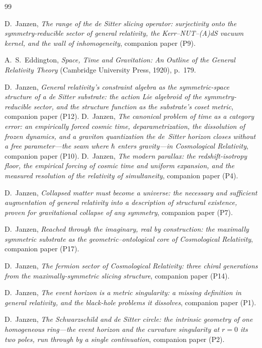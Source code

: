\documentclass[11pt,a4paper]{article}
\begin{document}
\begin{thebibliography}{99}

D.~Janzen,
\emph{The range of the de Sitter slicing operator: surjectivity onto the symmetry-reducible sector of general relativity, the Kerr--NUT--(A)dS vacuum kernel, and the wall of inhomogeneity}, companion paper (P9).

 A.~S.~Eddington, \emph{Space, Time and Gravitation: An Outline of the General Relativity Theory} (Cambridge University Press, 1920), p.~179.

 D.~Janzen,
\emph{General relativity's constraint algebra as the symmetric-space structure of a de Sitter substrate: the action Lie algebroid of the symmetry-reducible sector, and the structure function as the substrate's coset metric}, companion paper (P12).
 D.~Janzen, \emph{The canonical problem of time as a category error: an empirically forced cosmic time, deparametrization, the dissolution of frozen dynamics, and a graviton quantization the de~Sitter horizon closes without a free parameter---the seam where $\hbar$ enters gravity---in Cosmological Relativity}, companion paper (P10).
D.~Janzen,
\emph{The modern parallax: the redshift-isotropy floor, the empirical forcing of cosmic time and uniform expansion, and the measured resolution of the relativity of simultaneity}, companion paper (P4).

 D.~Janzen, \emph{Collapsed matter must become a universe: the necessary and sufficient augmentation of general relativity into a description of structural existence, proven for gravitational collapse of any symmetry}, companion paper (P7).

 D.~Janzen, \emph{Reached through the imaginary, real by construction: the maximally symmetric substrate as the geometric--ontological core of Cosmological Relativity}, companion paper (P17).

 D.~Janzen, \emph{The fermion sector of Cosmological Relativity: three chiral generations from the maximally-symmetric slicing structure}, companion paper (P14).

D.~Janzen,
\emph{The event horizon is a metric singularity: a missing definition in general relativity, and the black-hole problems it dissolves}, companion paper (P1).

D.~Janzen,
\emph{The Schwarzschild and de Sitter circle: the intrinsic geometry of one homogeneous ring---the event horizon and the curvature singularity at $r=0$ its two poles, run through by a single continuation}, companion paper (P2).


\end{thebibliography}
\end{document}
